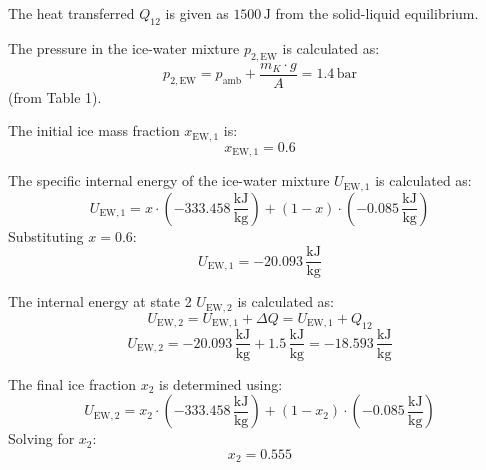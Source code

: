 The heat transferred \( Q_{12} \) is given as \( 1500 \, \text{J} \) from the solid-liquid equilibrium.  

The pressure in the ice-water mixture \( p_{2,\text{EW}} \) is calculated as:  
\[
p_{2,\text{EW}} = p_{\text{amb}} + \frac{m_K \cdot g}{A} = 1.4 \, \text{bar}
\]  
(from Table 1).  

The initial ice mass fraction \( x_{\text{EW},1} \) is:  
\[
x_{\text{EW},1} = 0.6
\]  

The specific internal energy of the ice-water mixture \( U_{\text{EW},1} \) is calculated as:  
\[
U_{\text{EW},1} = x \cdot (-333.458 \, \frac{\text{kJ}}{\text{kg}}) + (1 - x) \cdot (-0.085 \, \frac{\text{kJ}}{\text{kg}})
\]  
Substituting \( x = 0.6 \):  
\[
U_{\text{EW},1} = -20.093 \, \frac{\text{kJ}}{\text{kg}}
\]  

The internal energy at state 2 \( U_{\text{EW},2} \) is calculated as:  
\[
U_{\text{EW},2} = U_{\text{EW},1} + \Delta Q = U_{\text{EW},1} + Q_{12}
\]  
\[
U_{\text{EW},2} = -20.093 \, \frac{\text{kJ}}{\text{kg}} + 1.5 \, \frac{\text{kJ}}{\text{kg}} = -18.593 \, \frac{\text{kJ}}{\text{kg}}
\]  

The final ice fraction \( x_2 \) is determined using:  
\[
U_{\text{EW},2} = x_2 \cdot (-333.458 \, \frac{\text{kJ}}{\text{kg}}) + (1 - x_2) \cdot (-0.085 \, \frac{\text{kJ}}{\text{kg}})
\]  
Solving for \( x_2 \):  
\[
x_2 = 0.555
\]